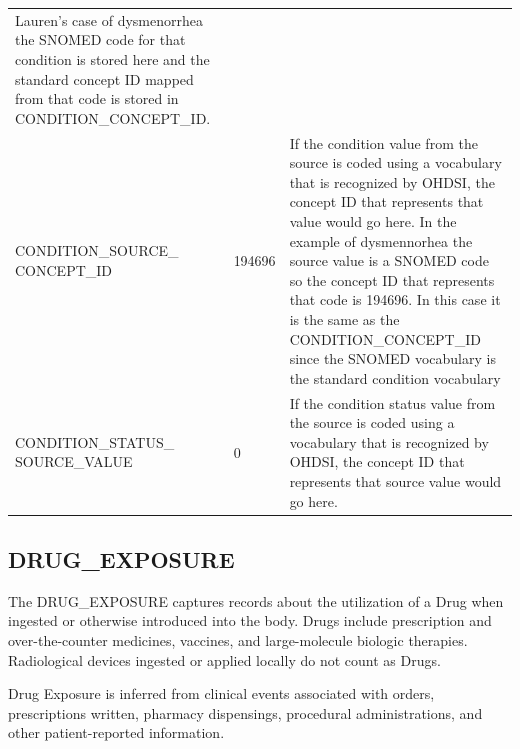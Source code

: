 \documentclass[11pt]{book}
\begin{document}
\begin{longtable}[]{@{}lll@{}}
\begin{minipage}[t]{0.48\columnwidth}
Lauren's case of dysmenorrhea the SNOMED code for that condition is
stored here and the standard concept ID mapped from that code is stored
in CONDITION\_CONCEPT\_ID.\strut
\end{minipage}\tabularnewline
\begin{minipage}[t]{0.31\columnwidth}\raggedright\strut
CONDITION\_SOURCE\_ CONCEPT\_ID\strut
\end{minipage} & \begin{minipage}[t]{0.12\columnwidth}\raggedright\strut
194696\strut
\end{minipage} & \begin{minipage}[t]{0.48\columnwidth}\raggedright\strut
If the condition value from the source is coded using a vocabulary that
is recognized by OHDSI, the concept ID that represents that value would
go here. In the example of dysmennorhea the source value is a SNOMED
code so the concept ID that represents that code is 194696. In this case
it is the same as the CONDITION\_CONCEPT\_ID since the SNOMED vocabulary
is the standard condition vocabulary\strut
\end{minipage}\tabularnewline
\begin{minipage}[t]{0.31\columnwidth}\raggedright\strut
CONDITION\_STATUS\_ SOURCE\_VALUE\strut
\end{minipage} & \begin{minipage}[t]{0.12\columnwidth}\raggedright\strut
0\strut
\end{minipage} & \begin{minipage}[t]{0.48\columnwidth}\raggedright\strut
If the condition status value from the source is coded using a
vocabulary that is recognized by OHDSI, the concept ID that represents
that source value would go here.\strut
\end{minipage}\tabularnewline
\bottomrule
\end{longtable}

\subsection{DRUG\_EXPOSURE}\label{drugExposure}

The DRUG\_EXPOSURE captures records about the utilization of a Drug when
ingested or otherwise introduced into the body. Drugs include
prescription and over-the-counter medicines, vaccines, and
large-molecule biologic therapies. Radiological devices ingested or
applied locally do not count as Drugs.

Drug Exposure is inferred from clinical events associated with orders,
prescriptions written, pharmacy dispensings, procedural administrations,
and other patient-reported information.
\end{document}
